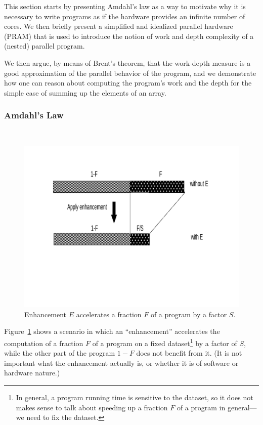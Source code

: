 \documentclass[acmsmall,review]{acmart}\settopmatter{printfolios=true,printccs=false,printacmref=false}
\begin{document}
This section starts by presenting Amdahl's law as a way to
motivate why it is necessary to write programs as if the
hardware provides an infinite number of cores. We then
briefly present a simplified and idealized parallel hardware 
(PRAM) that is used to introduce the notion of work and depth 
complexity of a (nested) parallel program. 

We then argue, by means of Brent's theorem, that the 
work-depth measure is a good approximation of the parallel 
behavior of the program, and we demonstrate how one can 
reason about computing the program's work and the depth 
for the simple case of summing up the elements of an array.

\subsubsection{Amdahl's Law}
\label{subsubsub:amdahl}
$\mbox{ }$\\

\begin{figure}
\vspace{-3ex}
\includegraphics[width=50ex]{Figures/L2/Amdahl}\vspace{-15ex}
\caption{Enhancement $E$ accelerates a fraction $F$ of a program by a factor $S$.}
\label{fig:amdahl-assump}
\end{figure} 

Figure~\ref{fig:amdahl-assump} shows a scenario in which
an ``enhancement'' accelerates the computation of a fraction
$F$ of a program on a fixed dataset\footnote{
In general, a program running time is sensitive to the dataset,
so it does not makes sense to talk about speeding up a fraction
$F$ of a program in general---we need to fix the dataset.
} by a factor of $S$, while the other part of the program 
$1-F$ does not benefit from it.
(It is not important what the enhancement actually is,
or whether it is of software or hardware nature.)
\end{document}
